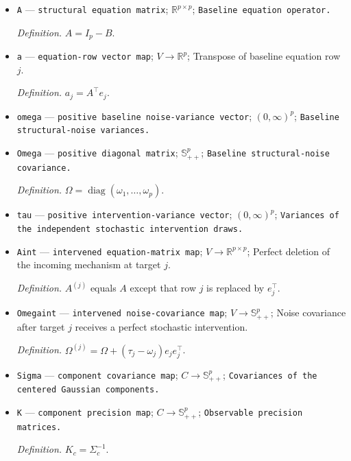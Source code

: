 \documentclass{article}
\begin{document}
\begin{itemize}
  \par\smallskip\noindent\emph{Definition.} \(B_{ji}\neq0\) if and only if \(i\in\operatorname{Pa}(j)\), and \(B_{jj}=0\).
  \item \texttt{A} --- \texttt{structural equation matrix}; \(\mathbb R^{p\times p}\); \texttt{Baseline equation operator.}
  \par\smallskip\noindent\emph{Definition.} \(A=I_p-B\).
  \item \texttt{a} --- \texttt{equation-\allowbreak{}row vector map}; \(V\to\mathbb R^p\); Transpose of baseline equation row \(j\).
  \par\smallskip\noindent\emph{Definition.} \(a_j=A^{\top}e_j\).
  \item \texttt{omega} --- \texttt{positive baseline noise-\allowbreak{}variance vector}; \((0,\infty)^p\); \texttt{Baseline structural-\allowbreak{}noise variances.}
  \item \texttt{Omega} --- \texttt{positive diagonal matrix}; \(\mathbb S_{++}^p\); \texttt{Baseline structural-\allowbreak{}noise covariance.}
  \par\smallskip\noindent\emph{Definition.} \(\Omega=\operatorname{diag}(\omega_1,\ldots,\omega_p)\).
  \item \texttt{tau} --- \texttt{positive intervention-\allowbreak{}variance vector}; \((0,\infty)^p\); \texttt{Variances of the independent stochastic intervention draws.}
  \item \texttt{Aint} --- \texttt{intervened equation-\allowbreak{}matrix map}; \(V\to\mathbb R^{p\times p}\); Perfect deletion of the incoming mechanism at target \(j\).
  \par\smallskip\noindent\emph{Definition.} \(A^{(j)}\) equals \(A\) except that row \(j\) is replaced by \(e_j^{\top}\).
  \item \texttt{Omegaint} --- \texttt{intervened noise-\allowbreak{}covariance map}; \(V\to\mathbb S_{++}^p\); Noise covariance after target \(j\) receives a perfect stochastic intervention.
  \par\smallskip\noindent\emph{Definition.} \(\Omega^{(j)}=\Omega+(\tau_j-\omega_j)e_je_j^{\top}\).
  \item \texttt{Sigma} --- \texttt{component covariance map}; \(C\to\mathbb S_{++}^p\); \texttt{Covariances of the centered Gaussian components.}
  \item \texttt{K} --- \texttt{component precision map}; \(C\to\mathbb S_{++}^p\); \texttt{Observable precision matrices.}
  \par\smallskip\noindent\emph{Definition.} \(K_c=\Sigma_c^{-1}\).

\end{itemize}
\end{document}
